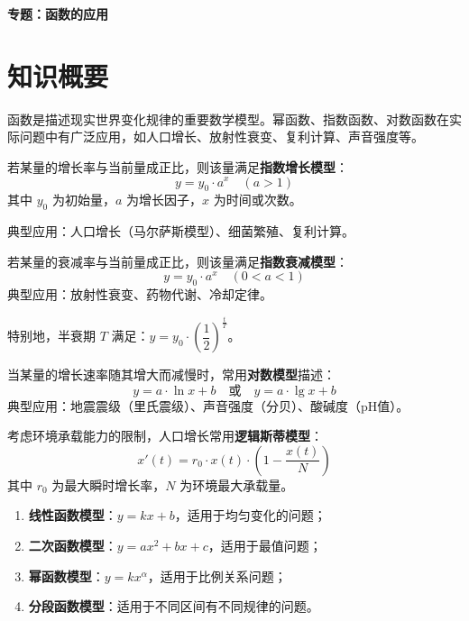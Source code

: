 \documentclass[11pt]{ctexrep}
\begin{document}
\begin{center}
    {\LARGE\bfseries 专题：函数的应用}
\end{center}

\section*{知识概要}

函数是描述现实世界变化规律的重要数学模型。幂函数、指数函数、对数函数在实际问题中有广泛应用，如人口增长、放射性衰变、复利计算、声音强度等。

\begin{definition}[指数增长模型]
    若某量的增长率与当前量成正比，则该量满足\textbf{指数增长模型}：
    \[
        y = y_0 \cdot a^x \quad (a > 1)
    \]
    其中 $y_0$ 为初始量，$a$ 为增长因子，$x$ 为时间或次数。
    
    典型应用：人口增长（马尔萨斯模型）、细菌繁殖、复利计算。
\end{definition}

\begin{definition}[指数衰减模型]
    若某量的衰减率与当前量成正比，则该量满足\textbf{指数衰减模型}：
    \[
        y = y_0 \cdot a^x \quad (0 < a < 1)
    \]
    典型应用：放射性衰变、药物代谢、冷却定律。
    
    特别地，半衰期 $T$ 满足：$y = y_0 \cdot \left(\dfrac{1}{2}\right)^{\frac{t}{T}}$。
\end{definition}

\begin{definition}[对数模型]
    当某量的增长速率随其增大而减慢时，常用\textbf{对数模型}描述：
    \[
        y = a \cdot \ln x + b \quad \text{或} \quad y = a \cdot \lg x + b
    \]
    典型应用：地震震级（里氏震级）、声音强度（分贝）、酸碱度（pH值）。
\end{definition}

\begin{definition}[逻辑斯蒂模型]
    考虑环境承载能力的限制，人口增长常用\textbf{逻辑斯蒂模型}：
    \[
        x'(t) = r_0 \cdot x(t) \cdot \left(1 - \dfrac{x(t)}{N}\right)
    \]
    其中 $r_0$ 为最大瞬时增长率，$N$ 为环境最大承载量。
\end{definition}

\begin{property}[常用数学模型]
    \begin{enumerate}
        \item \textbf{线性函数模型}：$y = kx + b$，适用于均匀变化的问题；
        \item \textbf{二次函数模型}：$y = ax^2 + bx + c$，适用于最值问题；
        \item \textbf{幂函数模型}：$y = kx^\alpha$，适用于比例关系问题；
        \item \textbf{分段函数模型}：适用于不同区间有不同规律的问题。
    \end{enumerate}
\end{property}
\end{document}
